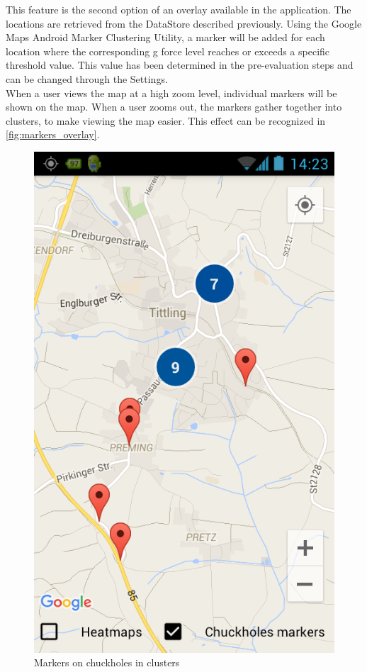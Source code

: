 \documentclass[10pt,a4paper]{article} %
\begin{document}
    This feature is the second option of an overlay available in the application. The locations are retrieved from the DataStore described previously. Using the Google Maps Android Marker Clustering Utility, a marker will be added for each location where the corresponding g force level reaches or exceeds a specific threshold value. This value has been determined in the pre-evaluation steps and can be changed through the Settings. \\
    When a user views the map at a high zoom level, individual markers will be shown on the map. When a user zooms out, the markers gather together into clusters, to make viewing the map easier. This effect can be recognized in \autoref{fig:markers_overlay}.
    
    \begin{figure}[H]
    \centering
	
	   
       	\includegraphics[scale=0.31]{pic3}
   	\caption{Markers on chuckholes in clusters}
	\label{fig:markers_overlay}
	\end{figure}
    
\end{document}
